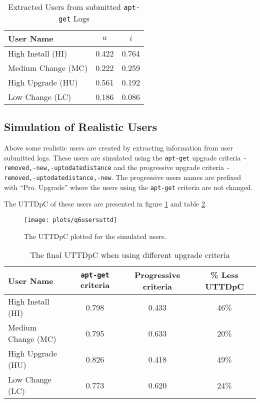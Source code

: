 \begin{table}[h!]
\centering
\begin{tabular}{|l | c | c | }
\hline
User Name 				& 	$u$ 		& $i$ 		\\ \hline
High Install (HI)			& 0.422			& 0.764 	\\
Medium Change (MC)			& 0.222			& 0.259 	\\
High Upgrade (HU)			& 0.561			& 0.192		\\
Low Change 	(LC)			& 0.186			& 0.086 	\\ \hline
\end{tabular}
\caption{Extracted Users from submitted \texttt{apt-get} Logs}
\label{exp.tbluserlogs}
\end{table}

\subsection{Simulation of Realistic Users}
\label{exp.q4}
Above some realistic users are created by extracting information from user submitted logs.
These users are simulated using the \texttt{apt-get} upgrade criteria \texttt{-removed,-new,-uptodatedistance} and the progressive upgrade criteria \texttt{-removed,-uptodatedistance,-new}.
The progressive users names are prefixed  with ``Pro. Upgrade'' where the users using the \texttt{apt-get} criteria are not changed.

The UTTDpC of these users are presented in figure \ref{exp.q6uttdpc} and table \ref{exp.tblq6uttd}.
\begin{figure}[htp]
\begin{center}
  \texttt{[image: plots/q6usersuttd]}
  \caption{The UTTDpC plotted for the simulated users.}
  \label{exp.q6uttdpc}
\end{center}
\end{figure}

\begin{table}[h!]
\centering
\begin{tabular}{|l | c | c | c | }
\hline
User Name 				& \texttt{apt-get} criteria & Progressive criteria 	& \% Less UTTDpC	\\ \hline
High Install (HI)			& 0.798				& 0.433 			& 46\%	\\
Medium Change (MC)			& 0.795				& 0.633 			& 20\% 	\\
High Upgrade (HU)			& 0.826				& 0.418				& 49\%  \\
Low Change 	(LC)			& 0.773				& 0.620 			& 24\%   \\ \hline
\end{tabular}
\caption{The final UTTDpC when using different upgrade criteria}
\label{exp.tblq6uttd}
\end{table}

